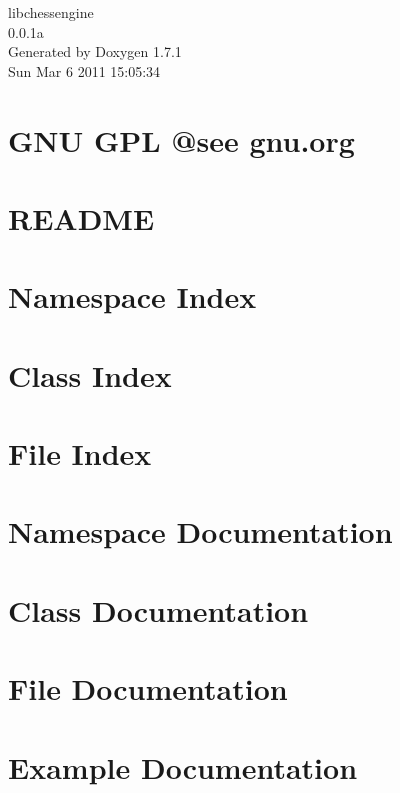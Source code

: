 \documentclass[a4paper]{book}
\begin{document}
\hypersetup{pageanchor=false}
\begin{titlepage}
\vspace*{7cm}
\begin{center}
{\Large libchessengine \\[1ex]\large 0.0.1a }\\
\vspace*{1cm}
{\large Generated by Doxygen 1.7.1}\\
\vspace*{0.5cm}
{\small Sun Mar 6 2011 15:05:34}\\
\end{center}
\end{titlepage}
\clearemptydoublepage
{}
\tableofcontents
\clearemptydoublepage
{}
\hypersetup{pageanchor=true}
\chapter{GNU GPL @see gnu.org}
\label{index}\hypertarget{index}{}
\chapter{README}
\label{README}
\hypertarget{README}{}

\chapter{Namespace Index}

\chapter{Class Index}

\chapter{File Index}

\chapter{Namespace Documentation}

\chapter{Class Documentation}




\chapter{File Documentation}


\chapter{Example Documentation}

\printindex
\end{document}
